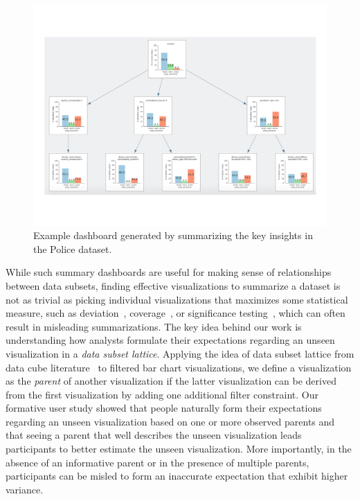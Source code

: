 \begin{figure}[h!]
\centering
\includegraphics[width=0.7\linewidth]{figures/storyboard.pdf}
\caption{Example dashboard generated by \sbd summarizing the key insights in the Police dataset.}
\label{fig:sbd}
\end{figure} 
\par While such summary dashboards are useful for making sense of relationships between data subsets, finding effective visualizations to summarize a dataset is not as trivial as picking individual visualizations that maximizes some statistical measure, such as deviation~\cite{Vartak2015}, coverage~\cite{Sarvghad2017}, or significance testing~\cite{Anand2015}, which can often result in misleading summarizations. The key idea behind our work is understanding how analysts formulate their expectations regarding an unseen visualization in a \textit{data subset lattice}. Applying the idea of data subset lattice from data cube literature~\cite{Harinarayan1996} to filtered bar chart visualizations, we define a visualization as the \textit{parent} of another visualization if the latter visualization can be derived from the first visualization by adding one additional filter constraint. %
Our formative user study showed that people naturally form their expectations regarding an unseen visualization based on one or more observed parents and that seeing a parent that well describes the unseen visualization leads participants to better estimate the unseen visualization. More importantly, in the absence of an informative parent or in the presence of multiple parents, participants can be misled to form an inaccurate expectation that exhibit higher variance. 

